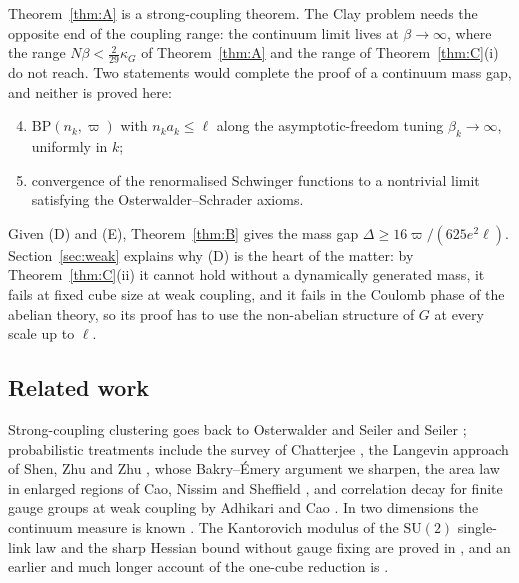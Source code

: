 \documentclass[11pt]{amsart}
\theoremstyle{definition}
\theoremstyle{remark}
\numberwithin{equation}{section}
\newcommand{\SU}{\mathrm{SU}}
\newcommand{\BP}{\mathrm{BP}}
\begin{document}
Theorem~\ref{thm:A} is a strong-coupling theorem. The Clay problem needs the
opposite end of the coupling range: the continuum limit lives at
$\beta\to\infty$, where the range $N\beta<\frac2{29}\kappa_G$ of
Theorem~\ref{thm:A} and the range of Theorem~\ref{thm:C}(i) do not reach. Two
statements would complete the proof of a continuum mass gap, and neither is
proved here:
\begin{enumerate}[label=\textup{(\Alph*)},leftmargin=*]
\setcounter{enumi}{3}
\item $\BP(n_k,\varpi)$ with $n_ka_k\le\ell$ along the asymptotic-freedom
tuning $\beta_k\to\infty$, uniformly in $k$;
\item convergence of the renormalised Schwinger functions to a nontrivial
limit satisfying the Osterwalder--Schrader axioms.
\end{enumerate}
Given (D) and (E), Theorem~\ref{thm:B} gives the mass gap $\Delta\ge
16\varpi/(625e^2\ell)$. Section~\ref{sec:weak} explains why (D) is the heart of
the matter: by Theorem~\ref{thm:C}(ii) it cannot hold without a dynamically
generated mass, it fails at fixed cube size at weak coupling, and it fails in
the Coulomb phase of the abelian theory, so its proof has to use the
non-abelian structure of $G$ at every scale up to $\ell$.

\subsection{Related work}

Strong-coupling clustering goes back to Osterwalder and Seiler \cite{OSei78}
and Seiler \cite{Sei82}; probabilistic treatments include the survey of
Chatterjee \cite{Chat19}, the Langevin approach of Shen, Zhu and Zhu
\cite{SZZ23}, whose Bakry--\'Emery argument we sharpen, the area law in
enlarged regions of Cao, Nissim and Sheffield \cite{CNS25}, and correlation
decay for finite gauge groups at weak coupling by Adhikari and Cao \cite{AC25}.
In two dimensions the continuum measure is known
\cite{GKS89,Dri89,Lev03}. The Kantorovich modulus of the $\SU(2)$ single-link
law and the sharp Hessian bound without gauge fixing are proved in
\cite{BB26a}, and an earlier and much longer account of the one-cube
reduction is \cite{BBLR26}.
\end{document}
